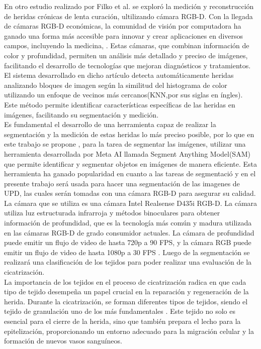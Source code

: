 \documentclass[12pt]{article}
\begin{document}
	En otro estudio realizado por Filko et al. \cite{Filko2018} se explor\'o la medici\'on y reconstrucci\'on de heridas cr\'onicas de lenta curaci\'on, ultilizando c\'amara RGB-D. Con la llegada de cámaras RGB-D económicas, la comunidad de visión por computadora ha ganado una forma más accesible para innovar y crear aplicaciones en diversos campos, incluyendo la medicina, \cite{Filko2018}. Estas cámaras, que combinan información de color y profundidad, permiten un análisis más detallado y preciso de imágenes, facilitando el desarrollo de tecnologías que mejoran diagnósticos y tratamientos. El sistema desarrollado en dicho art\'iculo detecta automáticamente heridas analizando bloques de imagen según la similitud del histograma de color utilizando un enfoque de vecinos más cercanos(KNN,por sus siglas en \'ingles). Este método permite identificar características específicas de las heridas en imágenes, facilitando su segmentación y medición.
	\\
	
	Es fundamental el desarrollo de una herramienta capaz de realizar la segmentaci\'on y la medici\'on de estas heridas lo m\'as preciso posible, por lo que en este trabajo se propone , para la tarea de segmentar las im\'agenes,  utilizar una herramienta desarrollada por Meta AI llamada Segment Anything Model(SAM)\parencite{segmentanything2023} que permite identificar y segmentar objetos en imágenes de manera eficiente. Esta herramienta ha ganado popularidad en cuanto a las tareas de segmentaci\'o y en el presente trabajo ser\'a usada para hacer una segmentaci\'on de las imagenes de UPD, las cuales ser\'an tomadas con una c\'amara RGB-D para asegurar su calidad.
	\\
	
	 La c\'amara que se utiliza es una c\'amara Intel Realsense D435i RGB-D. La cámara utiliza luz estructurada infrarroja y métodos binoculares para obtener información de profundidad, que es la tecnología más común y madura utilizada en las cámaras RGB-D de grado consumidor actuales. La cámara de profundidad puede emitir un flujo de video de hasta 720p a 90 FPS, y la cámara RGB puede emitir un flujo de video de hasta 1080p a 30 FPS \parencite{Zhang2023}. Luego de la segmentaci\'on se realizar\'a una clasificaci\'on de los tejidos para poder realizar una evaluaci\'on de la cicatrizaci\'on.
	 \\
	 
	La importancia de los tejidos en el proceso de cicatrización radica en que cada tipo de tejido desempeña un papel crucial en la reparación y regeneración de la herida. Durante la cicatrización, se forman diferentes tipos de tejidos, siendo el tejido de granulación uno de los más fundamentales \parencite{CUN2023}. Este tejido no solo es esencial para el cierre de la herida, sino que también prepara el lecho para la epitelización, proporcionando un entorno adecuado para la migración celular y la formación de nuevos vasos sanguíneos.
	
\end{document}
